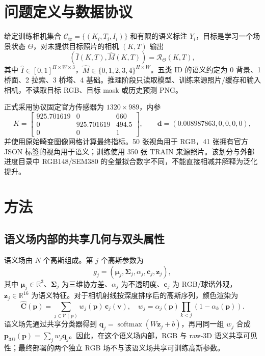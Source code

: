 \documentclass[UTF8,a4paper,11pt]{ctexart}
\newcommand{\R}{\mathbb{R}}
\begin{document}
\section{问题定义与数据协议}
给定训练相机集合 $\mathcal{C}_{\mathrm{tr}}=\{(K_i,T_i,I_i)\}$ 和有限的语义标注 $Y_i$，目标是学习一个场景状态 $\Theta$，对未提供目标照片的相机 $(K,T)$ 输出
\begin{equation}
  (\widehat I(K,T),\widehat M(K,T))=\mathcal{R}_{\Theta}(K,T),
\end{equation}
其中 $\widehat I\in[0,1]^{H\times W\times3}$，$\widehat M\in\{0,1,2,3,4\}^{H\times W}$。五类 ID 的语义约定为 0 背景、1 桥面、2 拉索、3 桥塔、4 基础。推理阶段只读取模型、训练来源照片/缓存和输入相机，不读取目标 RGB、目标 mask 或历史预测 PNG。

正式采用协议固定官方传感器为 $1320\times989$，内参
\[
K=\begin{bmatrix}925.701619&0&660\\0&925.701619&494.5\\0&0&1\end{bmatrix},\qquad
\mathbf d=(0.008987863,0,0,0,0),
\]
并使用原始畸变图像网格计算最终指标。50 张视角用于 RGB，41 张拥有官方 JSON 标签的视角用于语义；训练使用 350 张 TRAIN 来源照片。该划分与外部进度目录中 RGB148/SEM380 的全量拟合数字不同，不能直接相减并解释为泛化提升。

\section{方法}
\subsection{语义场内部的共享几何与双头属性}
语义场由 $N$ 个高斯组成。第 $j$ 个高斯参数为
\begin{equation}
  g_j=(\boldsymbol\mu_j,\boldsymbol{\Sigma}_j,\alpha_j,\mathbf c_j,\mathbf z_j),
\end{equation}
其中 $\boldsymbol\mu_j\in\R^3$、$\boldsymbol{\Sigma}_j$ 为三维协方差、$\alpha_j$ 为不透明度、$\mathbf c_j$ 为 RGB/球谐外观，$\mathbf z_j\in\R^{16}$ 为语义特征。对于相机射线按深度排序后的高斯序列，颜色渲染为
\begin{equation}
  \widehat{\mathbf C}(\mathbf p)=\sum_{j\in\mathcal{V}(\mathbf p)}w_j(\mathbf p)\,\mathbf c_j(\mathbf v),
  \quad w_j=\alpha_j(\mathbf p)\prod_{k<j}(1-\alpha_k(\mathbf p)).
\end{equation}
语义场先通过共享分类器得到 $\mathbf q_j=\operatorname{softmax}(W\mathbf z_j+b)$，再用同一组 $w_j$ 合成 $\mathbf p_{3D}(\mathbf p)=\sum_jw_j\mathbf q_j$。因此，在这个语义场内部，RGB 与 raw-3D 语义共享可见性；最终部署的两个独立 RGB 场不与该语义场共享可训练高斯参数。
\end{document}
